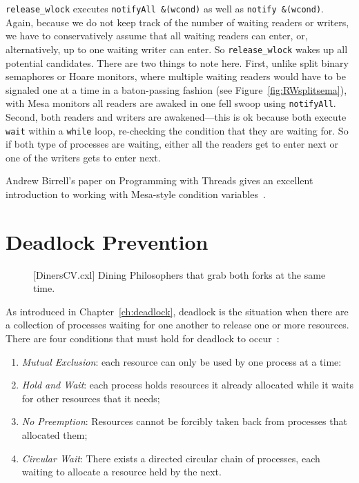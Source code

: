 \documentclass{report}
\newenvironment{code}{
\tcolorbox
}{
\endtcolorbox
}
\begin{document}
\texttt{release\_wlock} executes \texttt{notifyAll \&(wcond)} as well as
\texttt{notify \&(wcond)}.
Again, because we do not keep track of the number of waiting readers or writers, we
have to conservatively assume that all waiting readers can enter, or, alternatively,
up to one waiting writer can enter.  So \texttt{release\_wlock} wakes up all
potential candidates.
There are two things to note here.  First, unlike split binary semaphores or Hoare
monitors, where multiple waiting readers would have to be signaled one at a time in a
baton-passing fashion (see Figure~\ref{fig:RWsplitsema}), with Mesa monitors
all readers are awaked in one fell swoop using \texttt{notifyAll}.
Second, both readers and writers are awakened---this is ok because both execute
\texttt{wait} within a \texttt{while} loop, re-checking the condition that they
are waiting for.  So if both type of processes are waiting, either all the readers
get to enter next or one of the writers gets to enter next.

Andrew Birrell's paper on Programming with Threads gives an excellent
introduction to working with Mesa-style condition variables~\cite{Birrell89}.

\chapter{Deadlock Prevention}
\label{ch:deadlockprevention}

\begin{figure}
\begin{code}
\end{code}
\caption{[DinersCV.cxl] Dining Philosophers that grab both forks at the same time.}
\label{fig:dinerscv}
\end{figure}

As introduced in Chapter~\ref{ch:deadlock}, deadlock is the situation when there are
a collection of processes waiting for one another to release one or more resources.
There are four conditions that must hold for deadlock to occur~\cite{CES71}:
\begin{enumerate}
\item \emph{Mutual Exclusion}: each resource can only be used by one process at a time:
\item \emph{Hold and Wait}: each process holds resources it already allocated while it
waits for other resources that it needs;
\item \emph{No Preemption}: Resources cannot be forcibly taken back from processes that
allocated them;
\item \emph{Circular Wait}: There exists a directed circular chain of processes, each waiting
to allocate a resource held by the next.
\end{enumerate}
\end{document}
